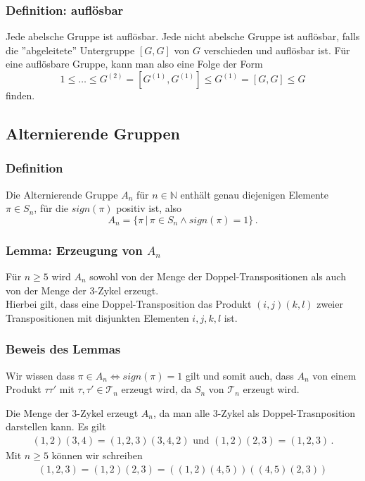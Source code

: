 \documentclass[12pt, german]{article}
\newcommand{\N}{\mathbb{N}}
\begin{document}
	\subsubsection{Definition: auflösbar}
	Jede abelsche Gruppe ist auflösbar. Jede nicht abelsche Gruppe ist auflösbar, falls die ''abgeleitete'' Untergruppe $[G, G]$ von $G$ verschieden und auflösbar ist. 
	Für eine auflösbare Gruppe, kann man also eine Folge der Form
	\begin{equation*}
		1 \leq \ldots \leq G^{(2)} = [G^{(1)}, G^{(1)} ] \leq G^{(1)} = [G, G ] \leq G  
	\end{equation*}
	finden.
	
	\subsection{Alternierende Gruppen}
	
	\subsubsection{Definition}
	Die Alternierende Gruppe $A_n$ für $n \in \N$ enthält genau diejenigen Elemente $\pi \in S_n$, für die $sign(\pi)$ positiv ist, also $$A_n=\{\pi\, | \, \pi \in S_n \wedge sign(\pi) = 1\}\, .$$
	\subsubsection{Lemma: Erzeugung von $A_n$}
	Für $n \geq 5$ wird $A_n$ sowohl von der Menge der Doppel-Transpositionen als auch von der Menge der $3$-Zykel erzeugt.\\
	Hierbei gilt, dass eine Doppel-Transposition das Produkt $(i,j)(k,l)$ zweier Transpositionen mit disjunkten Elementen $i,j,k,l$ ist.
	
	\subsubsection{Beweis des Lemmas}
	Wir wissen dass $\pi \in A_n \iff sign(\pi) = 1$ gilt und somit auch, dass $A_n$ von einem Produkt $\tau \tau'$ mit $\tau, \tau' \in \mathcal T_n$ erzeugt wird, 
	da $S_n$ von $\mathcal T_n$ erzeugt wird. 
	\newline 
	
	Die Menge der $3$-Zykel erzeugt $A_n$, da man alle $3$-Zykel als Doppel-Trasnposition darstellen kann.
	Es gilt 
	\begin{align*}
		(1,2)(3,4) = (1,2,3)(3,4,2) \text{ und } (1,2)(2,3) = (1,2,3)\, .
	\end{align*}
	Mit $n\geq 5$ können wir schreiben 
	\begin{align*}
		(1,2, 3) = (1,2)(2,3) =((1,2)(4,5))((4,5)(2,3))
	\end{align*}
	
\end{document}

